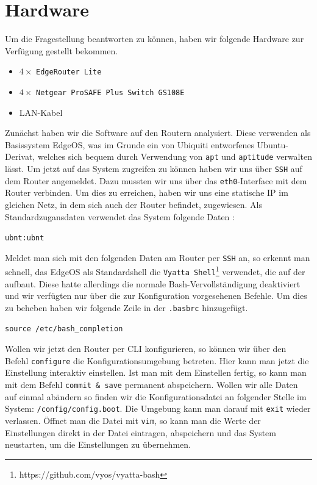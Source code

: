 \documentclass[11pt,a4paper]{article}
\begin{document}
\section{Hardware}

Um die Fragestellung beantworten zu können, haben wir folgende
Hardware zur Verfügung gestellt bekommen.
\begin{itemize}
\item $4\times$ \texttt{EdgeRouter Lite}
\item $4\times$ \texttt{Netgear ProSAFE Plus Switch GS108E}
\item LAN-Kabel
\end{itemize}
Zunächst haben wir die Software auf den Routern analysiert. Diese
verwenden als Basissystem EdgeOS, was im Grunde ein von Ubiquiti
entworfenes Ubuntu-Derivat, welches sich bequem durch Verwendung von
\texttt{apt} und \texttt{aptitude} verwalten lässt. Um jetzt auf das
System zugreifen zu können haben wir uns über \texttt{SSH} auf dem
Router angemeldet. Dazu mussten wir uns über das
\texttt{eth0}-Interface mit dem Router verbinden. Um dies zu
erreichen, haben wir uns eine statische IP im gleichen Netz, in dem
sich auch der Router befindet, zugewiesen. Als Standardzugansdaten
verwendet das System folgende Daten : 
\begin{center}
  \texttt{ubnt:ubnt} \\
\end{center}
Meldet man sich mit den folgenden Daten am Router per \texttt{SSH} an,
so erkennt man schnell, das EdgeOS als Standardshell die
\texttt{Vyatta Shell}\footnote[1]{https://github.com/vyos/vyatta-bash}
verwendet, die auf der  aufbaut. Diese hatte allerdings
die normale Bash-Vervollständigung deaktiviert und wir verfügten nur
über die zur Konfiguration vorgesehenen Befehle. Um dies zu beheben haben wir folgende Zeile in der \texttt{.basbrc} hinzugefügt.
\lstset{
  basicstyle=\footnotesize, frame=tb,
  xleftmargin=.05\textwidth, xrightmargin=.05\textwidth
}
\begin{lstlisting}
source /etc/bash_completion
\end{lstlisting}

Wollen wir jetzt den Router per CLI konfigurieren, so können wir über
den Befehl \texttt{configure} die Konfigurationsumgebung
betreten. Hier kann man jetzt die Einstellung interaktiv
einstellen. Ist man mit dem Einstellen fertig, so kann man mit dem
Befehl \texttt{commit \& save} permanent abspeichern. Wollen wir alle
Daten auf einmal abändern so finden wir die Konfigurationsdatei an
folgender Stelle im System: \texttt{/config/config.boot}. Die Umgebung
kann man darauf mit \texttt{exit} wieder verlassen. Öffnet man die
Datei mit \texttt{vim}, so kann man die Werte der Einstellungen direkt
in der Datei eintragen, abspeichern und das System neustarten, um die
Einstellungen zu übernehmen.
\end{document}
